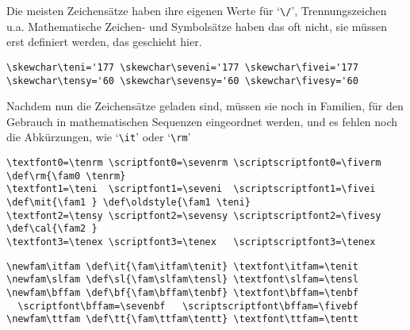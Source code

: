 \begin{appendix}
Die meisten Zeichens\"atze haben ihre eigenen Werte f\"ur `\verb|\/|',
Trennungszeichen u.a. Mathematische Zeichen- und Symbols\"atze haben das
oft nicht, sie m\"ussen erst definiert werden, das geschieht hier.
\begin{verbatim}
\skewchar\teni='177 \skewchar\seveni='177 \skewchar\fivei='177
\skewchar\tensy='60 \skewchar\sevensy='60 \skewchar\fivesy='60
\end{verbatim}
Nachdem nun die Zeichens\"atze geladen sind, m\"ussen sie noch in
Familien, f\"ur den Gebrauch in mathematischen Sequenzen eingeordnet
werden, und es fehlen noch die 
Abk\"urzungen, wie `\verb|\it|' oder
`\verb|\rm|'
\begin{verbatim}
\textfont0=\tenrm \scriptfont0=\sevenrm \scriptscriptfont0=\fiverm
\def\rm{\fam0 \tenrm}
\textfont1=\teni  \scriptfont1=\seveni  \scriptscriptfont1=\fivei
\def\mit{\fam1 } \def\oldstyle{\fam1 \teni}
\textfont2=\tensy \scriptfont2=\sevensy \scriptscriptfont2=\fivesy
\def\cal{\fam2 }
\textfont3=\tenex \scriptfont3=\tenex   \scriptscriptfont3=\tenex
\end{verbatim}
\begin{verbatim}
\newfam\itfam \def\it{\fam\itfam\tenit} \textfont\itfam=\tenit
\newfam\slfam \def\sl{\fam\slfam\tensl} \textfont\slfam=\tensl
\newfam\bffam \def\bf{\fam\bffam\tenbf} \textfont\bffam=\tenbf
  \scriptfont\bffam=\sevenbf   \scriptscriptfont\bffam=\fivebf
\newfam\ttfam \def\tt{\fam\ttfam\tentt} \textfont\ttfam=\tentt
\end{verbatim}

\end{appendix}
